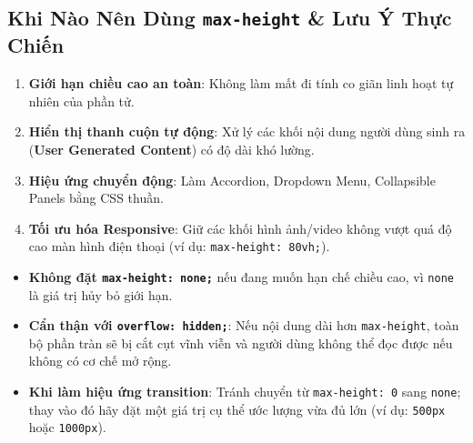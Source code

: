 \documentclass[11pt,oneside]{book}
\newcommand{\codeinline}[1]{\textcolor{accentOrange}{\texttt{#1}}}
\newcommand{\term}[1]{\textbf{\textcolor{primaryBlue}{#1}}}
\DeclareRobustCommand{\csshint}[1]{\texorpdfstring{\textcolor{accentOrange}{\textbf{\texttt{#1}}}}{#1}}
\begin{document}
\subsection{Khi Nào Nên Dùng \csshint{max-height} \& Lưu Ý Thực Chiến}
\label{subsec:when_to_use_max_height}

\begin{tipBox}
\begin{enumerate}[leftmargin=1.5em, itemsep=3pt, parsep=0pt]
    \item \textbf{Giới hạn chiều cao an toàn}: Không làm mất đi tính co giãn linh hoạt tự nhiên của phần tử.
    \item \textbf{Hiển thị thanh cuộn tự động}: Xử lý các khối nội dung người dùng sinh ra (\term{User Generated Content}) có độ dài khó lường.
    \item \textbf{Hiệu ứng chuyển động}: Làm Accordion, Dropdown Menu, Collapsible Panels bằng CSS thuần.
    \item \textbf{Tối ưu hóa Responsive}: Giữ các khối hình ảnh/video không vượt quá độ cao màn hình điện thoại (ví dụ: \codeinline{max-height: 80vh;}).
\end{enumerate}
\end{tipBox}

\begin{warnBox}
\begin{itemize}[leftmargin=1.5em, itemsep=3pt, parsep=0pt]
    \item \textbf{Không đặt \codeinline{max-height: none;}} nếu đang muốn hạn chế chiều cao, vì \codeinline{none} là giá trị hủy bỏ giới hạn.
    \item \textbf{Cẩn thận với \codeinline{overflow: hidden;}}: Nếu nội dung dài hơn \codeinline{max-height}, toàn bộ phần tràn sẽ bị cắt cụt vĩnh viễn và người dùng không thể đọc được nếu không có cơ chế mở rộng.
    \item \textbf{Khi làm hiệu ứng transition}: Tránh chuyển từ \codeinline{max-height: 0} sang \codeinline{none}; thay vào đó hãy đặt một giá trị cụ thể ước lượng vừa đủ lớn (ví dụ: \codeinline{500px} hoặc \codeinline{1000px}).
\end{itemize}
\end{warnBox}
\end{document}
